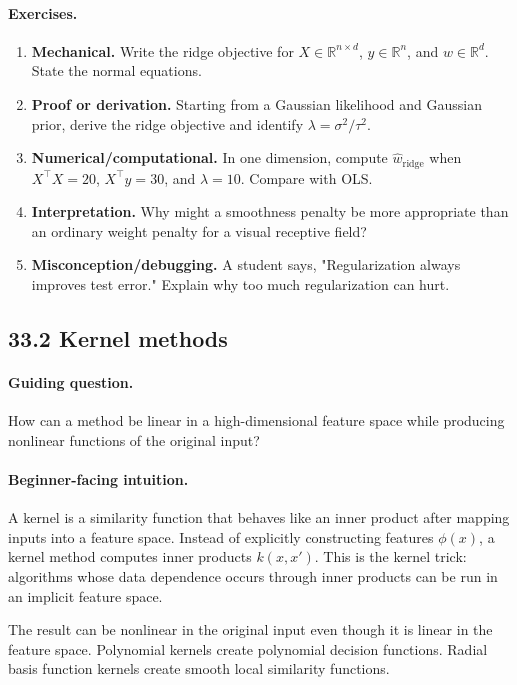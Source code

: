 \paragraph{Exercises.}
\begin{enumerate}[label=\textbf{33.1.\arabic*.}, leftmargin=*]
\item \textbf{Mechanical.} Write the ridge objective for \(X\in\mathbb R^{n\times d}\), \(y\in\mathbb R^n\), and \(w\in\mathbb R^d\). State the normal equations.
\item \textbf{Proof or derivation.} Starting from a Gaussian likelihood and Gaussian prior, derive the ridge objective and identify \(\lambda=\sigma^2/\tau^2\).
\item \textbf{Numerical/computational.} In one dimension, compute \(\widehat w_{\mathrm{ridge}}\) when \(X^\top X=20\), \(X^\top y=30\), and \(\lambda=10\). Compare with OLS.
\item \textbf{Interpretation.} Why might a smoothness penalty be more appropriate than an ordinary weight penalty for a visual receptive field?
\item \textbf{Misconception/debugging.} A student says, "Regularization always improves test error." Explain why too much regularization can hurt.
\end{enumerate}

\subsection{33.2 Kernel methods}

\paragraph{Guiding question.}
How can a method be linear in a high-dimensional feature space while producing nonlinear functions of the original input?

\paragraph{Beginner-facing intuition.}
A kernel is a similarity function that behaves like an inner product after mapping inputs into a feature space. Instead of explicitly constructing features \(\phi(x)\), a kernel method computes inner products \(k(x,x')\). This is the kernel trick: algorithms whose data dependence occurs through inner products can be run in an implicit feature space.

The result can be nonlinear in the original input even though it is linear in the feature space. Polynomial kernels create polynomial decision functions. Radial basis function kernels create smooth local similarity functions.


